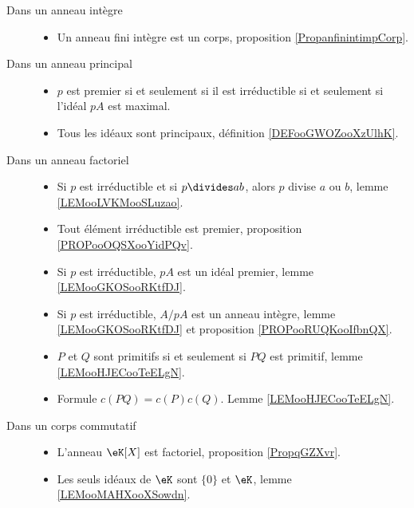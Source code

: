 \begin{description}
	\item[Dans un anneau intègre]\hspace{1cm}
	\begin{itemize}
		\item
		      Un anneau fini intègre est un corps, proposition \ref{PropanfinintimpCorp}.
	\end{itemize}
	\item[Dans un anneau principal]\hspace{1cm}
	\begin{itemize}
		\item
		      \( p\) est premier si et seulement si il est irréductible si et seulement si l'idéal \( pA\) est maximal.
		\item
		      Tous les idéaux sont principaux, définition \ref{DEFooGWOZooXzUlhK}.
	\end{itemize}
	\item[Dans un anneau factoriel]\hspace{1cm}
	\begin{itemize}
		\item
		      Si \( p\) est irréductible et si \( p\divides ab\), alors \( p\) divise \( a\) ou \( b\), lemme \ref{LEMooLVKMooSLuzao}.
		\item
		      Tout élément irréductible est premier, proposition \ref{PROPooOQSXooYidPQv}.
		\item
		      Si \( p\) est irréductible, \( pA\) est un idéal premier, lemme \ref{LEMooGKOSooRKtfDJ}.
		\item
		      Si \( p\) est irréductible, \( A/pA\) est un anneau intègre, lemme \ref{LEMooGKOSooRKtfDJ} et proposition \ref{PROPooRUQKooIfbnQX}.
		\item
		      \( P\) et \( Q\) sont primitifs si et seulement si \( PQ\) est primitif, lemme \ref{LEMooHJECooTeELgN}.
		\item
		      Formule \( c(PQ)=c(P)c(Q)\). Lemme \ref{LEMooHJECooTeELgN}.
	\end{itemize}
	\item[Dans un corps commutatif]\hspace{1cm}
	\begin{itemize}
		\item
		      L'anneau \( \eK[X]\) est factoriel, proposition \ref{PropqGZXvr}.
		\item
		      Les seuls idéaux de \( \eK\) sont \( \{ 0 \}\) et \( \eK\), lemme \ref{LEMooMAHXooXSowdn}.
	\end{itemize}

\end{description}


